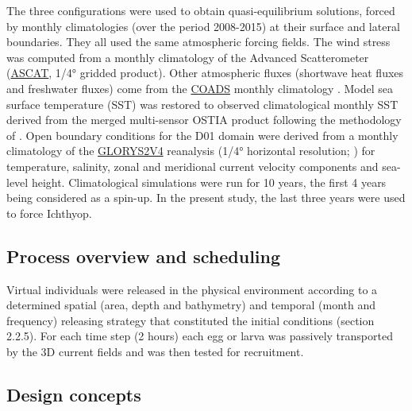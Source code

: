 The three configurations were used to obtain quasi-equilibrium solutions, forced by monthly climatologies (over the period 2008-2015) at their surface and lateral boundaries. They all used the same atmospheric forcing fields. The wind stress was computed from a monthly climatology of the Advanced Scatterometer (\href{https://www.ospo.noaa.gov/Products/atmosphere/ascat/}{ASCAT}, 1/4° gridded product). Other atmospheric fluxes (shortwave heat fluxes and freshwater fluxes) come from the \href{https://repository.library.noaa.gov/view/noaa/49337}{COADS} monthly climatology \citep{DasiYoun1994}. Model sea surface temperature (SST) was restored to observed climatological monthly SST derived from the merged multi-sensor OSTIA product \citep{DonlMart2012} following the methodology of \citep{BarnSief1995}. Open boundary conditions for the D01 domain were derived from a monthly climatology of the \href{https://www.mercator-ocean.eu/en/ocean-science/glorys/}{GLORYS2V4} reanalysis (1/4° horizontal resolution; \citep{FerrPare2012}) for temperature, salinity, zonal and meridional current velocity components and sea-level height. Climatological simulations were run for 10 years, the first 4 years being considered as a spin-up. In the present study, the last three years were used to force Ichthyop.\\

\subsection{Process overview and scheduling}\label{Chap2MethProc}

Virtual individuals were released in the physical environment according to a determined spatial (area, depth and bathymetry) and temporal (month and frequency) releasing strategy that constituted the initial conditions (section 2.2.5). For each time step (2 hours) each egg or larva was passively transported by the 3D current fields and was then tested for recruitment.\\

\subsection{Design concepts}\label{Chap2MethDesi}

